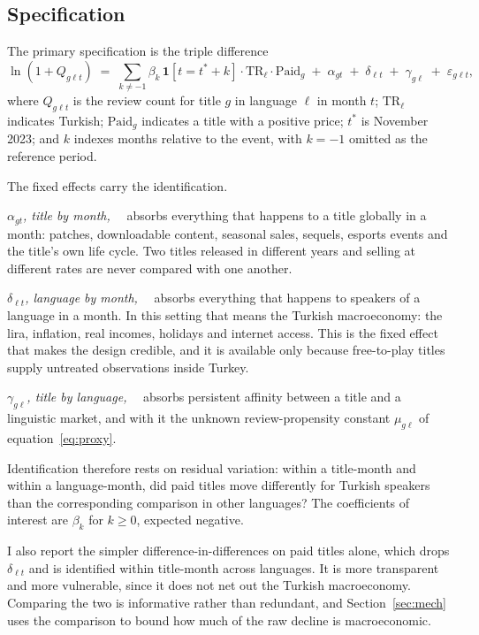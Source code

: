\documentclass[11pt]{article}
\newcommand{\heading}[1]{\vspace{3pt}\noindent\textit{#1}\ \ }
\begin{document}
\subsection{Specification}

The primary specification is the triple difference
\begin{equation}
\ln\!\left(1+Q_{g\ell t}\right) \;=\;
\sum_{k \neq -1}\beta_k\, \mathbf{1}\!\left[t = t^{*}+k\right] \cdot \mathrm{TR}_\ell \cdot \mathrm{Paid}_g
\;+\; \alpha_{gt} \;+\; \delta_{\ell t} \;+\; \gamma_{g\ell} \;+\; \varepsilon_{g\ell t},
\label{eq:ddd}
\end{equation}
where $Q_{g\ell t}$ is the review count for title $g$ in language $\ell$ in month $t$;
$\mathrm{TR}_\ell$ indicates Turkish; $\mathrm{Paid}_g$ indicates a title with a positive price;
$t^{*}$ is November 2023; and $k$ indexes months relative to the event, with $k=-1$ omitted as the
reference period.

The fixed effects carry the identification.

\heading{$\alpha_{gt}$, title by month,} absorbs everything that happens to a title globally in a
month: patches, downloadable content, seasonal sales, sequels, esports events and the title's own
life cycle. Two titles released in different years and selling at different rates are never
compared with one another.

\heading{$\delta_{\ell t}$, language by month,} absorbs everything that happens to speakers of a
language in a month. In this setting that means the Turkish macroeconomy: the lira, inflation,
real incomes, holidays and internet access. This is the fixed effect that makes the design
credible, and it is available only because free-to-play titles supply untreated observations
inside Turkey.

\heading{$\gamma_{g\ell}$, title by language,} absorbs persistent affinity between a title and a
linguistic market, and with it the unknown review-propensity constant $\mu_{g\ell}$ of
equation~\eqref{eq:proxy}.

Identification therefore rests on residual variation: within a title-month and within a
language-month, did paid titles move differently for Turkish speakers than the corresponding
comparison in other languages? The coefficients of interest are $\beta_k$ for $k \ge 0$, expected
negative.

I also report the simpler difference-in-differences on paid titles alone, which drops
$\delta_{\ell t}$ and is identified within title-month across languages. It is more transparent and
more vulnerable, since it does not net out the Turkish macroeconomy. Comparing the two is
informative rather than redundant, and Section~\ref{sec:mech} uses the comparison to bound how much
of the raw decline is macroeconomic.
\end{document}
